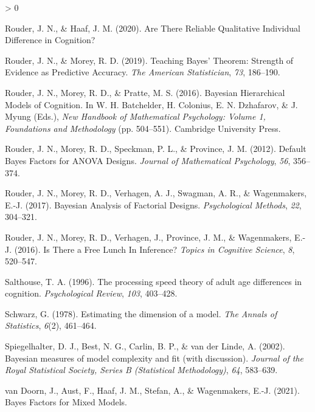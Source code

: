\documentclass[
  english,
  ,man]{apa6}
\newlength{\cslhangindent}
\newenvironment{CSLReferences}[2] %
 {%
  \setlength{\parindent}{0pt}
  \ifodd #1 \everypar{\setlength{\hangindent}{\cslhangindent}}\ignorespaces\fi
  \ifnum #2 > 0
  \setlength{\parskip}{#2\baselineskip}
  \fi
 }%
 {}
\begin{document}
\begin{CSLReferences}{1}{0}
\leavevmode\hypertarget{ref-Rouder.Haaf.2020}{}%
Rouder, J. N., \& Haaf, J. M. (2020). Are {There Reliable Qualitative Individual Difference} in {Cognition}?

\leavevmode\hypertarget{ref-Rouder.Morey.2019}{}%
Rouder, J. N., \& Morey, R. D. (2019). Teaching {Bayes}' {Theorem}: {Strength} of {Evidence} as {Predictive Accuracy}. \emph{The American Statistician}, \emph{73}, 186--190.

\leavevmode\hypertarget{ref-Rouder.etal.2016a}{}%
Rouder, J. N., Morey, R. D., \& Pratte, M. S. (2016). Bayesian {Hierarchical Models} of {Cognition}. In W. H. Batchelder, H. Colonius, E. N. Dzhafarov, \& J. Myung (Eds.), \emph{New {Handbook} of {Mathematical Psychology}: {Volume} 1, {Foundations} and {Methodology}} (pp. 504--551). {Cambridge University Press}.

\leavevmode\hypertarget{ref-Rouder.etal.2012}{}%
Rouder, J. N., Morey, R. D., Speckman, P. L., \& Province, J. M. (2012). Default {Bayes Factors} for {ANOVA Designs}. \emph{Journal of Mathematical Psychology}, \emph{56}, 356--374.

\leavevmode\hypertarget{ref-Rouder.etal.2017a}{}%
Rouder, J. N., Morey, R. D., Verhagen, A. J., Swagman, A. R., \& Wagenmakers, E.-J. (2017). Bayesian {Analysis} of {Factorial Designs}. \emph{Psychological Methods}, \emph{22}, 304--321.

\leavevmode\hypertarget{ref-Rouder.etal.2016b}{}%
Rouder, J. N., Morey, R. D., Verhagen, J., Province, J. M., \& Wagenmakers, E.-J. (2016). Is {There} a {Free Lunch In Inference}? \emph{Topics in Cognitive Science}, \emph{8}, 520--547.

\leavevmode\hypertarget{ref-Salthouse.1996}{}%
Salthouse, T. A. (1996). The processing speed theory of adult age differences in cognition. \emph{Psychological Review}, \emph{103}, 403--428.

\leavevmode\hypertarget{ref-Schwarz.1978}{}%
Schwarz, G. (1978). Estimating the dimension of a model. \emph{The Annals of Statistics}, \emph{6}(2), 461--464.

\leavevmode\hypertarget{ref-Spiegelhalter.etal.2002}{}%
Spiegelhalter, D. J., Best, N. G., Carlin, B. P., \& van der Linde, A. (2002). Bayesian measures of model complexity and fit (with discussion). \emph{Journal of the Royal Statistical Society, Series B (Statistical Methodology)}, \emph{64}, 583--639.

\leavevmode\hypertarget{ref-vanDoorn.etal.2021}{}%
van Doorn, J., Aust, F., Haaf, J. M., Stefan, A., \& Wagenmakers, E.-J. (2021). Bayes {Factors} for {Mixed Models}.


\end{CSLReferences}
\end{document}
